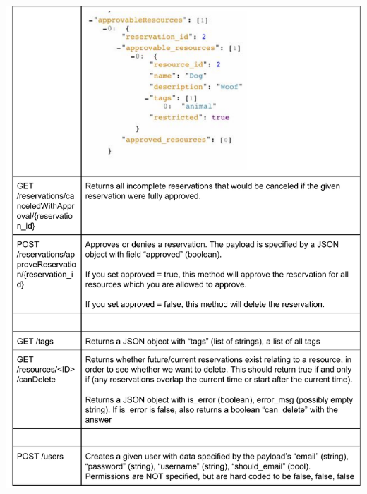 \documentclass[12pt]{article}
\begin{document}
\includegraphics[width=6in]{../ev3/apispec_04.pdf}
\end{document}
